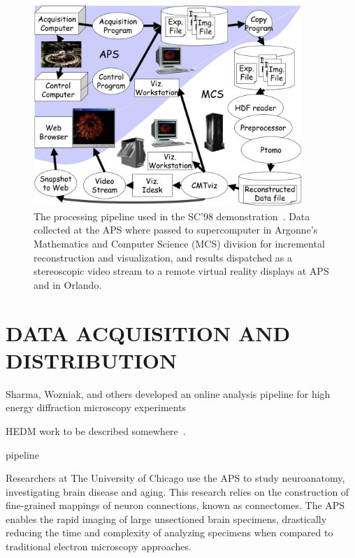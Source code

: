 \documentclass{aip-cp}
\newcommand\ian[1]{}
\newcommand\ryan[1]{}
\newcommand\ian[1]{{\color{red}[Ian: #1]}}
\newcommand\ryan[1]{{\color{green}[Ryan: #1]}}
\begin{document}
\begin{figure}[h]
  \centerline{\includegraphics[width=4in]{Figs/APS-Fig.png}}
  \caption{The processing pipeline used in the SC'98 demonstration~\cite{von2000real}. Data collected at the APS 
  where passed to supercomputer in Argonne's Mathematics and Computer Science (MCS) division for
  incremental reconstruction and visualization, and results dispatched as a stereoscopic
  video stream to a remote virtual reality displays at APS and in Orlando.\label{fig:sc98}}
\end{figure}

\section{DATA ACQUISITION AND DISTRIBUTION}

Sharma, Wozniak, and others developed an online analysis pipeline for high energy diffraction microscopy
experiments 

HEDM work to be described somewhere~\cite{park2015high}.

pipeline~\cite{wozniak2015big}


\ian{Petrel should get a mention.}

\ryan{Not sure if the plan was to discuss this. Feel free to cut it all.}

Researchers at The University of Chicago use the APS to study neuroanatomy, investigating brain 
disease and aging. This research relies on the construction of 
fine-grained mappings of neuron connections, known as connectomes. The APS enables the rapid 
imaging of large unsectioned brain specimens, drastically reducing the time and complexity of 
analyzing specimens when compared to traditional electron microscopy approaches.
\end{document}
